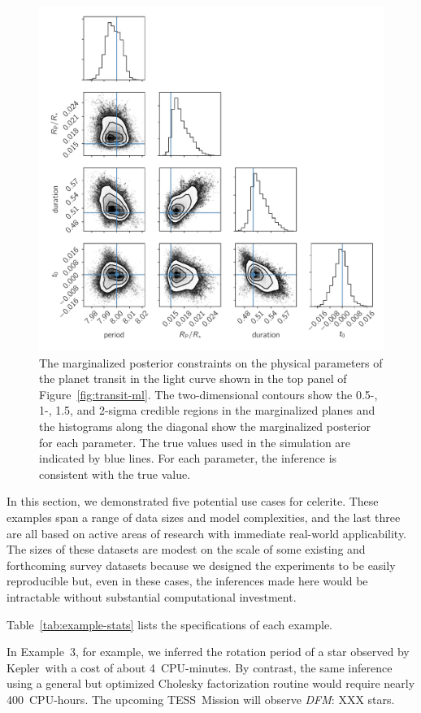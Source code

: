 \documentclass[manuscript, letterpaper]{aastex6}
\makeatletter
\let\origsubsection\subsection
\renewcommand\subsection{\@ifstar{\starsubsection}{\nostarsubsection}}
\newcommand\nostarsubsection[1]{\subsectionprelude\origsubsection{#1}}
\newcommand\starsubsection[1]{\subsectionprelude\origsubsection*{#1}}
\newcommand\subsectionprelude{\vspace{1em}}
\newcommand{\project}[1]{\textsf{#1}}
\newcommand{\kepler}{\project{Kepler}}
\newcommand{\tess}{\project{TESS}}
\newcommand{\celerite}{\project{celerite}}
\newcommand{\figureref}[1]{\ref{fig:#1}}
\newcommand{\Figure}[1]{Figure~\figureref{#1}}
\newcommand{\figurelabel}[1]{\label{fig:#1}}
\newcommand{\todo}[3]{{\color{#2}\emph{#1}: #3}}
\newcommand{\dfmtodo}[1]{\todo{DFM}{red}{#1}}
\newcommand{\response}[1]{{\color{blue}#1}}
\makeatother
\begin{document}
\begin{figure}[!p]
\begin{center}
\includegraphics[width=\textwidth]{figures/transit/transit-corner.pdf}
\caption{The marginalized posterior constraints on the physical parameters of
    the planet transit in the light curve shown in the top panel of
    \Figure{transit-ml}.
    The two-dimensional contours show the 0.5-, 1-, 1.5, and 2-sigma credible
    regions in the marginalized planes and the histograms along the diagonal
    show the marginalized posterior for each parameter.
    The true values used in the simulation are indicated by blue lines.
    For each parameter, the inference is consistent with the true value.
    \figurelabel{transit-corner}}
\end{center}
\end{figure}

\subsection{Summary}

\response{
In this section, we demonstrated five potential use cases for \celerite.
These examples span a range of data sizes and model complexities, and the
last three are all based on active areas of research with immediate real-world
applicability.
The sizes of these datasets are modest on the scale of some existing and
forthcoming survey datasets because we designed the experiments to be easily
reproducible but, even in these cases, the inferences made here would be
intractable without substantial computational investment.

Table~\ref{tab:example-stats} lists the specifications of each example.

In Example~3, for example, we inferred the rotation period of a star observed
by \kepler\ with a cost of about 4~CPU-minutes.
By contrast, the same inference using a general but optimized Cholesky
factorization routine would require nearly 400~CPU-hours.
The upcoming \tess\ Mission will observe \dfmtodo{XXX} stars.
}
\end{document}
